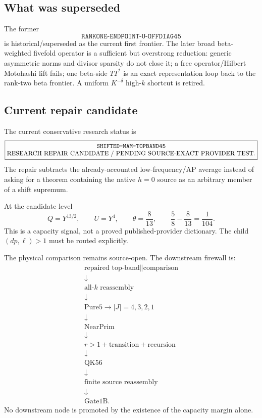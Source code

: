\documentclass[11pt]{article}
\theoremstyle{definition}
\newcommand{\1}{\mathbf 1}
\begin{document}
\subsection{What was superseded}

The former
\[
\texttt{RANKONE-ENDPOINT-U-OFFDIAG45}
\]
is historical/superseded as the current first frontier.  The later broad
beta-weighted fivefold operator is a sufficient but overstrong reduction: generic
asymmetric norms and divisor sparsity do not close it; a free operator/Hilbert Motohashi
lift fails; one beta-side $TT^\ast$ is an exact representation loop back to the rank-two
beta frontier.  A uniform $K^{-\delta}$ high-$k$ shortcut is retired.

\subsection{Current repair candidate}

The current conservative research status is
\[
\boxed{\begin{gathered}
\text{\ttfamily SHIFTED-MAM-TOPBAND45}\\[-1mm]
\text{RESEARCH REPAIR CANDIDATE / PENDING SOURCE-EXACT PROVIDER TEST}.
\end{gathered}}
\]
The repair subtracts the already-accounted low-frequency/AP average instead of asking for
a theorem containing the native $h=0$ source as an arbitrary member of a shift supremum.

At the candidate level
\[
Q=Y^{13/2},\qquad U=Y^4,\qquad \theta=\frac8{13},
\qquad
\frac58-\frac8{13}=\frac1{104}.
\]
This is a capacity signal, not a proved published-provider dictionary.  The child
$(dp,\ell)>1$ must be routed explicitly.

The physical comparison remains source-open.  The downstream firewall is:
\[
\begin{array}{c}
\text{repaired top-band}\parallel\text{comparison}\\
\downarrow\\
\text{all-}k\text{ reassembly}\\
\downarrow\\
\text{Pure5}\to |J|=4,3,2,1\\
\downarrow\\
\text{NearPrim}\\
\downarrow\\
r>1+\text{transition}+\text{recursion}\\
\downarrow\\
\text{QK56}\\
\downarrow\\
\text{finite source reassembly}\\
\downarrow\\
\text{Gate1B}.
\end{array}
\]
No downstream node is promoted by the existence of the capacity margin alone.
\end{document}
